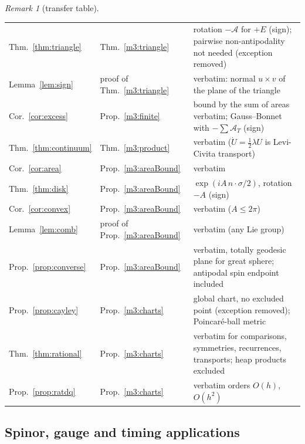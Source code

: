 \documentclass[11pt,reqno]{amsart}
\theoremstyle{definition}
\theoremstyle{remark}
\newtheorem{remark}[theorem]{Remark}
\numberwithin{equation}{section}
\begin{document}
\begin{remark}[transfer table]
\begin{center}
\begin{tabular}{p{}p{}p{}}
Thm.~\ref{thm:triangle} & Thm.~\ref{m3:triangle} & rotation $-\mathcal A$ for $+E$ (sign); pairwise non-antipodality not needed (exception removed)\\
Lemma~\ref{lem:sign} & proof of Thm.~\ref{m3:triangle} & verbatim: normal $u\times v$ of the plane of the triangle\\
Cor.~\ref{cor:excess} & Prop.~\ref{m3:finite} & bound by the sum of areas verbatim; Gauss--Bonnet with $-\sum\mathcal A_T$ (sign)\\
Thm.~\ref{thm:continuum} & Thm.~\ref{m3:product} & verbatim ($\dot U=\tfrac12\lambda U$ is Levi-Civita transport)\\
Cor.~\ref{cor:area} & Prop.~\ref{m3:areaBound} & verbatim\\
Thm.~\ref{thm:disk} & Prop.~\ref{m3:areaBound} & $\exp(iA\,n\cdot\sigma/2)$, rotation $-A$ (sign)\\
Cor.~\ref{cor:convex} & Prop.~\ref{m3:areaBound} & verbatim ($A\le2\pi$)\\
Lemma~\ref{lem:comb} & proof of Prop.~\ref{m3:areaBound} & verbatim (any Lie group)\\
Prop.~\ref{prop:converse} & Prop.~\ref{m3:areaBound} & verbatim, totally geodesic plane for great sphere; antipodal spin endpoint included\\
Prop.~\ref{prop:cayley} & Prop.~\ref{m3:charts} & global chart, no excluded point (exception removed); Poincar\'e-ball metric\\
Thm.~\ref{thm:rational} & Prop.~\ref{m3:charts} & verbatim for comparisons, symmetries, recurrences, transports; heap products excluded\\
Prop.~\ref{prop:ratdq} & Prop.~\ref{m3:charts} & verbatim orders $O(h)$, $O(h^2)$
\end{tabular}
\end{center}
\end{remark}

\subsection{Spinor, gauge and timing applications}
\end{document}
